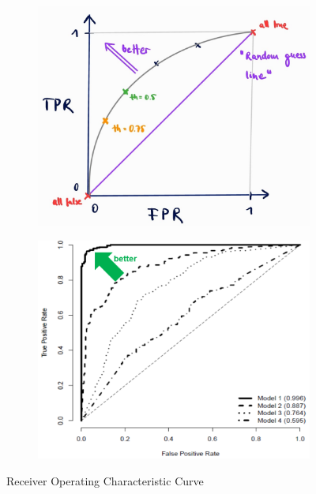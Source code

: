 \begin{figure}[ht]
  \centering
  \begin{subfigure}{0.4\textwidth}
    \includegraphics[width=\textwidth]{assets/sl/rocc__tpr_fpr.jpg}
  \end{subfigure}
  \vspace*{0.05\textwidth}
  \begin{subfigure}{0.5\textwidth}
    \includegraphics[width=\textwidth]{assets/sl/rocc__tpr_fpr_examples.png}
  \end{subfigure}

  \caption{Receiver Operating Characteristic Curve}
  \label{fig:7_ross_tpr_fpr}
\end{figure}

